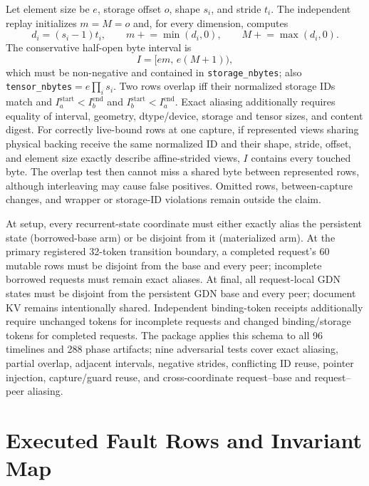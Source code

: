 \documentclass{article}
\begin{document}
Let element size be $e$, storage offset $o$, shape $s_i$, and stride $t_i$.
The independent replay initializes $m=M=o$ and, for every dimension, computes
\begin{equation}
  d_i=(s_i-1)t_i,\qquad
  m\mathrel{+}=\min(d_i,0),\qquad
  M\mathrel{+}=\max(d_i,0).
\end{equation}
The conservative half-open byte interval is
\begin{equation}
  I=[em,\,e(M+1)),
\end{equation}
which must be non-negative and contained in \texttt{storage\_nbytes}; also
\texttt{tensor\_nbytes}$=e\prod_i s_i$.  Two rows overlap iff their normalized
storage IDs match and $I_a^{\mathrm{start}}<I_b^{\mathrm{end}}$ and
$I_b^{\mathrm{start}}<I_a^{\mathrm{end}}$.  Exact aliasing additionally
requires equality of interval, geometry, dtype/device, storage and tensor
sizes, and content digest.  For correctly live-bound rows at one capture, if
represented views sharing physical backing receive the same normalized ID and
their shape, stride, offset, and element size exactly describe affine-strided
views, $I$ contains every touched byte.  The overlap test then cannot miss a
shared byte between represented rows, although interleaving may cause false
positives.  Omitted rows, between-capture changes, and wrapper or storage-ID
violations remain outside the claim.

At setup, every recurrent-state coordinate must either exactly alias the
persistent state (borrowed-base arm) or be disjoint from it (materialized
arm).  At the primary registered 32-token transition boundary, a completed
request's 60 mutable rows must be disjoint from the base and every peer;
incomplete borrowed requests must
remain exact aliases.  At final, all request-local GDN states must be disjoint
from the persistent GDN base and every peer; document KV remains intentionally
shared.
Independent binding-token receipts additionally require unchanged tokens for
incomplete requests and changed binding/storage tokens for completed requests.
The package applies this schema to all 96 timelines and 288 phase artifacts;
nine adversarial tests cover exact aliasing, partial overlap, adjacent
intervals, negative strides, conflicting ID reuse, pointer injection,
capture/guard reuse, and cross-coordinate request--base and request--peer
aliasing.

\section{Executed Fault Rows and Invariant Map}
\label{app:invariants}
\end{document}
